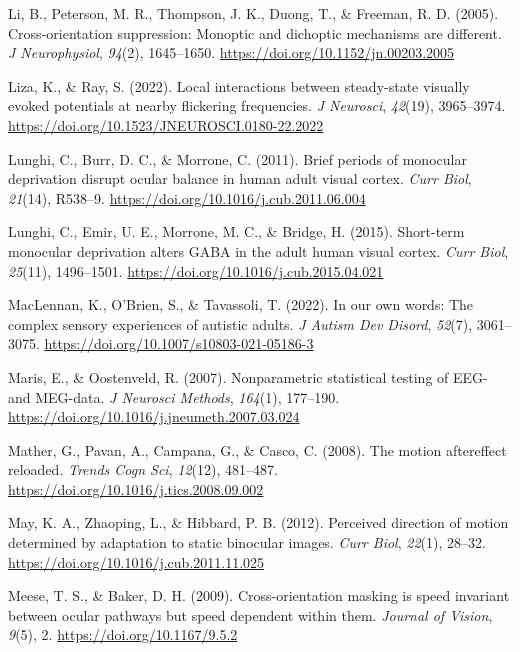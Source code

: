 \documentclass[
]{article}
\newlength{\cslhangindent}
\newlength{\cslentryspacingunit} %
\newenvironment{CSLReferences}[2] %
 {%
  \setlength{\parindent}{0pt}
  \ifodd #1
  \let\oldpar\par
  \def\par{\hangindent=\cslhangindent\oldpar}
  \fi
  \setlength{\parskip}{#2\cslentryspacingunit}
 }%
 {}
\begin{document}
\begin{CSLReferences}{1}{0}
\leavevmode{}%
Li, B., Peterson, M. R., Thompson, J. K., Duong, T., \& Freeman, R. D. (2005). Cross-orientation suppression: Monoptic and dichoptic mechanisms are different. \emph{J Neurophysiol}, \emph{94}(2), 1645--1650. \url{https://doi.org/10.1152/jn.00203.2005}

\leavevmode{}%
Liza, K., \& Ray, S. (2022). Local interactions between steady-state visually evoked potentials at nearby flickering frequencies. \emph{J Neurosci}, \emph{42}(19), 3965--3974. \url{https://doi.org/10.1523/JNEUROSCI.0180-22.2022}

\leavevmode{}%
Lunghi, C., Burr, D. C., \& Morrone, C. (2011). Brief periods of monocular deprivation disrupt ocular balance in human adult visual cortex. \emph{Curr Biol}, \emph{21}(14), R538--9. \url{https://doi.org/10.1016/j.cub.2011.06.004}

\leavevmode{}%
Lunghi, C., Emir, U. E., Morrone, M. C., \& Bridge, H. (2015). Short-term monocular deprivation alters GABA in the adult human visual cortex. \emph{Curr Biol}, \emph{25}(11), 1496--1501. \url{https://doi.org/10.1016/j.cub.2015.04.021}

\leavevmode{}%
MacLennan, K., O'Brien, S., \& Tavassoli, T. (2022). In our own words: The complex sensory experiences of autistic adults. \emph{J Autism Dev Disord}, \emph{52}(7), 3061--3075. \url{https://doi.org/10.1007/s10803-021-05186-3}

\leavevmode{}%
Maris, E., \& Oostenveld, R. (2007). Nonparametric statistical testing of EEG- and MEG-data. \emph{J Neurosci Methods}, \emph{164}(1), 177--190. \url{https://doi.org/10.1016/j.jneumeth.2007.03.024}

\leavevmode{}%
Mather, G., Pavan, A., Campana, G., \& Casco, C. (2008). The motion aftereffect reloaded. \emph{Trends Cogn Sci}, \emph{12}(12), 481--487. \url{https://doi.org/10.1016/j.tics.2008.09.002}

\leavevmode{}%
May, K. A., Zhaoping, L., \& Hibbard, P. B. (2012). Perceived direction of motion determined by adaptation to static binocular images. \emph{Curr Biol}, \emph{22}(1), 28--32. \url{https://doi.org/10.1016/j.cub.2011.11.025}

\leavevmode{}%
Meese, T. S., \& Baker, D. H. (2009). Cross-orientation masking is speed invariant between ocular pathways but speed dependent within them. \emph{Journal of Vision}, \emph{9}(5), 2. \url{https://doi.org/10.1167/9.5.2}


\end{CSLReferences}
\end{document}
